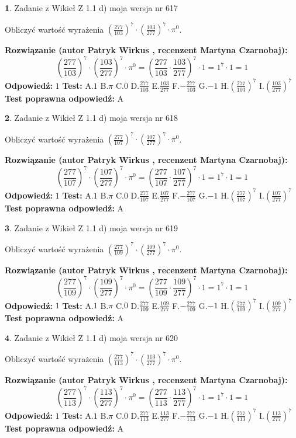 \documentclass[12pt, a4paper]{article}
\theoremstyle{definition} %
\newtheorem{zad}{}
\newcommand{\zadStart}[1]{\begin{zad}#1\newline}
\newcommand{\zadStop}{\end{zad}}
\newcommand{\rozwStart}[2]{\noindent \textbf{Rozwiązanie (autor #1 , recenzent #2): }\newline}
\newcommand{\rozwStop}{\newline}
\newcommand{\odpStart}{\noindent \textbf{Odpowiedź:}\newline}
\newcommand{\odpStop}{\newline}
\newcommand{\testStart}{\noindent \textbf{Test:}\newline}
\newcommand{\testStop}{\newline}
\newcommand{\kluczStart}{\noindent \textbf{Test poprawna odpowiedź:}\newline}
\newcommand{\kluczStop}{\newline}
\begin{document}
\zadStart{Zadanie z Wikieł Z 1.1 d) moja wersja nr 617}

Obliczyć wartość wyrażenia $(\frac{277}{103})^{7} \cdot (\frac{103}{277})^{7} \cdot \pi^{0}$.
\zadStop
\rozwStart{Patryk Wirkus}{Martyna Czarnobaj}
$$(\frac{277}{103})^{7} \cdot (\frac{103}{277})^{7} \cdot \pi^{0} = (\frac{277}{103} \cdot \frac{103}{277})^{7} \cdot 1 = 1^{7} \cdot 1 = 1$$
\rozwStop
\odpStart
$1$
\odpStop
\testStart
A.$1$ B.$\pi$ C.$0$ D.$\frac{277}{103}$ E.$\frac{103}{277}$
F.$-\frac{277}{103}$ G.$-1$
H.$(\frac{277}{103})^{7}$
I.$(\frac{103}{277})^{7}$
\testStop
\kluczStart
A
\kluczStop



\zadStart{Zadanie z Wikieł Z 1.1 d) moja wersja nr 618}

Obliczyć wartość wyrażenia $(\frac{277}{107})^{7} \cdot (\frac{107}{277})^{7} \cdot \pi^{0}$.
\zadStop
\rozwStart{Patryk Wirkus}{Martyna Czarnobaj}
$$(\frac{277}{107})^{7} \cdot (\frac{107}{277})^{7} \cdot \pi^{0} = (\frac{277}{107} \cdot \frac{107}{277})^{7} \cdot 1 = 1^{7} \cdot 1 = 1$$
\rozwStop
\odpStart
$1$
\odpStop
\testStart
A.$1$ B.$\pi$ C.$0$ D.$\frac{277}{107}$ E.$\frac{107}{277}$
F.$-\frac{277}{107}$ G.$-1$
H.$(\frac{277}{107})^{7}$
I.$(\frac{107}{277})^{7}$
\testStop
\kluczStart
A
\kluczStop



\zadStart{Zadanie z Wikieł Z 1.1 d) moja wersja nr 619}

Obliczyć wartość wyrażenia $(\frac{277}{109})^{7} \cdot (\frac{109}{277})^{7} \cdot \pi^{0}$.
\zadStop
\rozwStart{Patryk Wirkus}{Martyna Czarnobaj}
$$(\frac{277}{109})^{7} \cdot (\frac{109}{277})^{7} \cdot \pi^{0} = (\frac{277}{109} \cdot \frac{109}{277})^{7} \cdot 1 = 1^{7} \cdot 1 = 1$$
\rozwStop
\odpStart
$1$
\odpStop
\testStart
A.$1$ B.$\pi$ C.$0$ D.$\frac{277}{109}$ E.$\frac{109}{277}$
F.$-\frac{277}{109}$ G.$-1$
H.$(\frac{277}{109})^{7}$
I.$(\frac{109}{277})^{7}$
\testStop
\kluczStart
A
\kluczStop



\zadStart{Zadanie z Wikieł Z 1.1 d) moja wersja nr 620}

Obliczyć wartość wyrażenia $(\frac{277}{113})^{7} \cdot (\frac{113}{277})^{7} \cdot \pi^{0}$.
\zadStop
\rozwStart{Patryk Wirkus}{Martyna Czarnobaj}
$$(\frac{277}{113})^{7} \cdot (\frac{113}{277})^{7} \cdot \pi^{0} = (\frac{277}{113} \cdot \frac{113}{277})^{7} \cdot 1 = 1^{7} \cdot 1 = 1$$
\rozwStop
\odpStart
$1$
\odpStop
\testStart
A.$1$ B.$\pi$ C.$0$ D.$\frac{277}{113}$ E.$\frac{113}{277}$
F.$-\frac{277}{113}$ G.$-1$
H.$(\frac{277}{113})^{7}$
I.$(\frac{113}{277})^{7}$
\testStop
\kluczStart
A
\kluczStop
\end{document}
